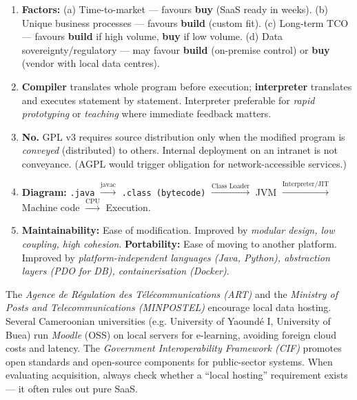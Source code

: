 \documentclass[11pt]{article}
\begin{document}
\begin{corrige}[Exercise 1]
\begin{enumerate}
\item \textbf{Factors:} (a) Time-to-market — favours \textbf{buy} (SaaS ready in weeks). (b) Unique business processes — favours \textbf{build} (custom fit). (c) Long-term TCO — favours \textbf{build} if high volume, \textbf{buy} if low volume. (d) Data sovereignty/regulatory — may favour \textbf{build} (on-premise control) or \textbf{buy} (vendor with local data centres).
\item \textbf{Compiler} translates whole program before execution; \textbf{interpreter} translates and executes statement by statement. Interpreter preferable for \emph{rapid prototyping} or \emph{teaching} where immediate feedback matters.
\item \textbf{No.} GPL v3 requires source distribution only when the modified program is \emph{conveyed} (distributed) to others. Internal deployment on an intranet is not conveyance. (AGPL would trigger obligation for network-accessible services.)
\item \textbf{Diagram:} \texttt{.java} $\xrightarrow{\text{javac}}$ \texttt{.class (bytecode)} $\xrightarrow{\text{Class Loader}}$ JVM $\xrightarrow{\text{Interpreter/JIT}}$ Machine code $\xrightarrow{\text{CPU}}$ Execution.
\item \textbf{Maintainability:} Ease of modification. Improved by \emph{modular design, low coupling, high cohesion}. \textbf{Portability:} Ease of moving to another platform. Improved by \emph{platform-independent languages (Java, Python), abstraction layers (PDO for DB), containerisation (Docker)}.
\end{enumerate}
\end{corrige}

\begin{savaistu}
The \emph{Agence de Régulation des Télécommunications (ART)} and the \emph{Ministry of Posts and Telecommunications (MINPOSTEL)} encourage local data hosting. Several Cameroonian universities (e.g. University of Yaoundé I, University of Buea) run \emph{Moodle} (OSS) on local servers for e-learning, avoiding foreign cloud costs and latency. The \emph{Government Interoperability Framework (CIF)} promotes open standards and open-source components for public-sector systems. When evaluating acquisition, always check whether a ``local hosting'' requirement exists — it often rules out pure SaaS.
\end{savaistu}
\end{document}
